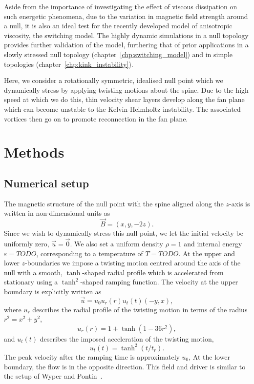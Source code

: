 Aside from the importance of investigating the effect of viscous dissipation on such energetic phenomena, due to the variation in magnetic field strength around a null, it is also an ideal test for the recently developed model of anisotropic viscosity, the switching model. The highly dynamic simulations in a null topology provides further validation of the model, furthering that of prior applications in a slowly stressed null topology (chapter~\ref{chp:switching_model}) and in simple topologies (chapter~\ref{chp:kink_instability}).

Here, we consider a rotationally symmetric, idealised null point which we dynamically stress by applying twisting motions about the spine. Due to the high speed at which we do this, thin velocity shear layers develop along the fan plane which can become unstable to the Kelvin-Helmholtz instability. The associated vortices then go on to promote reconnection in the fan plane. 

\section{Methods}

\subsection{Numerical setup}

The magnetic structure of the null point with the spine aligned along the $z$-axis is written in non-dimensional units as
\begin{equation}
  \label{eq:null_point_field}
  \vec{B} = (x, y, -2z).
\end{equation}
Since we wish to dynamically stress this null point, we let the initial velocity be uniformly zero, $\vec{u} = \vec{0}$. We also set a uniform density $\rho = 1$ and internal energy $\varepsilon = TODO$, corresponding to a temperature of $T = TODO$. At the upper and lower $z$-boundaries we impose a twisting motion centred around the axis of the null with a smooth, $\tanh$-shaped radial profile which is accelerated from stationary using a $\tanh^2$-shaped ramping function. The velocity at the upper boundary is explicitly written as
\begin{equation}
  \label{eq:null_twisting_profile}
  \vec{u} = u_0 u_r(r) u_t(t) (-y, x),
\end{equation}
where $u_r$ describes the radial profile of the twisting motion in terms of the radius $r^2 = x^2 + y^2$,
\begin{equation}
  \label{eq:radial_twisting_function}
  u_r(r) = 1 + \tanh(1 - 36r^2),
\end{equation}
and $u_t(t)$ describes the imposed acceleration of the twisting motion,
\begin{equation}
  \label{eq:ramping_up_function}
  u_t(t) = \tanh^2(t/t_r).
\end{equation}
The peak velocity after the ramping time is approximately $u_0$, At the lower boundary, the flow is in the opposite direction. This field and driver is similar to the setup of Wyper and Pontin~\cite{wyperKelvinHelmholtzInstabilityCurrentvortex2013}. 

